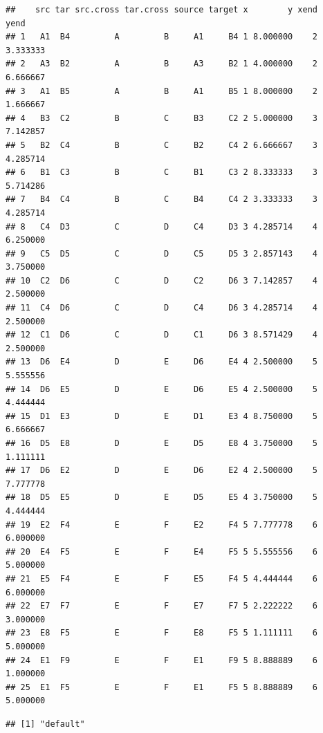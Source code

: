 \documentclass[
]{article}
\newenvironment{Shaded}{\begin{snugshade}}{\end{snugshade}}
\newcommand{\CommentTok}[1]{\textcolor[rgb]{0.56,0.35,0.01}{\textit{#1}}}
\newcommand{\KeywordTok}[1]{\textcolor[rgb]{0.13,0.29,0.53}{\textbf{#1}}}
\newcommand{\NormalTok}[1]{#1}
\newcommand{\OperatorTok}[1]{\textcolor[rgb]{0.81,0.36,0.00}{\textbf{#1}}}
\newcommand{\StringTok}[1]{\textcolor[rgb]{0.31,0.60,0.02}{#1}}
\begin{document}
\begin{verbatim}
##    src tar src.cross tar.cross source target x        y xend     yend
## 1   A1  B4         A         B     A1     B4 1 8.000000    2 3.333333
## 2   A3  B2         A         B     A3     B2 1 4.000000    2 6.666667
## 3   A1  B5         A         B     A1     B5 1 8.000000    2 1.666667
## 4   B3  C2         B         C     B3     C2 2 5.000000    3 7.142857
## 5   B2  C4         B         C     B2     C4 2 6.666667    3 4.285714
## 6   B1  C3         B         C     B1     C3 2 8.333333    3 5.714286
## 7   B4  C4         B         C     B4     C4 2 3.333333    3 4.285714
## 8   C4  D3         C         D     C4     D3 3 4.285714    4 6.250000
## 9   C5  D5         C         D     C5     D5 3 2.857143    4 3.750000
## 10  C2  D6         C         D     C2     D6 3 7.142857    4 2.500000
## 11  C4  D6         C         D     C4     D6 3 4.285714    4 2.500000
## 12  C1  D6         C         D     C1     D6 3 8.571429    4 2.500000
## 13  D6  E4         D         E     D6     E4 4 2.500000    5 5.555556
## 14  D6  E5         D         E     D6     E5 4 2.500000    5 4.444444
## 15  D1  E3         D         E     D1     E3 4 8.750000    5 6.666667
## 16  D5  E8         D         E     D5     E8 4 3.750000    5 1.111111
## 17  D6  E2         D         E     D6     E2 4 2.500000    5 7.777778
## 18  D5  E5         D         E     D5     E5 4 3.750000    5 4.444444
## 19  E2  F4         E         F     E2     F4 5 7.777778    6 6.000000
## 20  E4  F5         E         F     E4     F5 5 5.555556    6 5.000000
## 21  E5  F4         E         F     E5     F4 5 4.444444    6 6.000000
## 22  E7  F7         E         F     E7     F7 5 2.222222    6 3.000000
## 23  E8  F5         E         F     E8     F5 5 1.111111    6 5.000000
## 24  E1  F9         E         F     E1     F9 5 8.888889    6 1.000000
## 25  E1  F5         E         F     E1     F5 5 8.888889    6 5.000000
\end{verbatim}

\begin{Shaded}
\end{Shaded}

\begin{verbatim}
## [1] "default"
\end{verbatim}
\end{document}
